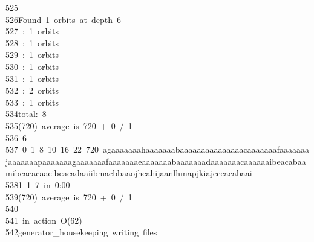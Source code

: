 \begin{tabbing}
525\>\\[0pt]
526\>Found\ 1\ orbits\ at\ depth\ 6\\[0pt]
527\ :\ 1\ orbits\\[0pt]
528\ :\ 1\ orbits\\[0pt]
529\ :\ 1\ orbits\\[0pt]
530\ :\ 1\ orbits\\[0pt]
531\ :\ 1\ orbits\\[0pt]
532\ :\ 2\ orbits\\[0pt]
533\ :\ 1\ orbits\\[0pt]
534\>total:\ 8\\[0pt]
535\>(720)\ average\ is\ 720\ +\ 0\ /\ 1\\[0pt]
536\>\ 6\\[0pt]
537\ 0\ 1\ 8\ 10\ 16\ 22\ 720\ agaaaaaaahaaaaaaabaaaaaaaaaaaaaaacaaaaaaafaaaaaaajaaaaaaapaaaaaaagaaaaaaafaaaaaaaeaaaaaaabaaaaaaadaaaaaaacaaaaaaibeacabaamibeacacaaeibeacadaaiibmacbbaaojheahijaanlhmapjkiajeceacabaai\\[0pt]
538\>1\ 1\ 7\ in\ 0:00\\[0pt]
539\>(720)\ average\ is\ 720\ +\ 0\ /\ 1\\[0pt]
540\>\\[0pt]
541\>\ in\ action\ O(62)\\[0pt]
542\>generator\_housekeeping\ writing\ files\\[0pt]

\end{tabbing}
